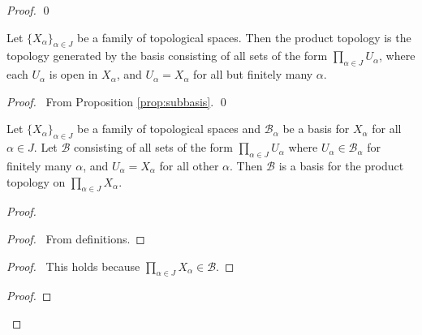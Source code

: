 \begin{proof}
  \pf
  \qed
\end{proof}

\begin{prop}
  Let $\{ X_\alpha \}_{\alpha \in J}$ be a family of topological spaces. Then the product topology is the topology generated by the basis consisting of all sets of the form $\prod_{\alpha \in J} U_\alpha$, where each $U_\alpha$ is open in $X_\alpha$, and $U_\alpha = X_\alpha$ for all but finitely many $\alpha$.
\end{prop}

\begin{proof}
  \pf\ From Proposition \ref{prop:subbasis}. \qed
\end{proof}

\begin{prop}
  \label{prop:product:basis}
  Let $\{ X_\alpha \}_{\alpha \in J}$ be a family of topological spaces and $\mathcal{B}_\alpha$ be a basis for $X_\alpha$ for all $\alpha \in J$. Let $\mathcal{B}$ consisting of all sets of the form $\prod_{\alpha \in J} U_\alpha$ where $U_\alpha \in \mathcal{B}_\alpha$ for finitely many $\alpha$, and
  $U_\alpha = X_\alpha$ for all other $\alpha$. Then $\mathcal{B}$ is a basis for the product topology on $\prod_{\alpha \in J} X_\alpha$.
\end{prop}

\begin{proof}
  \pf
  \begin{proof}
    \pf\ From definitions.
  \end{proof}
  \begin{proof}
    \pf\ This holds because $\prod_{\alpha \in J} X_\alpha \in \mathcal{B}$.
  \end{proof}
  \begin{proof}
  \end{proof}
\end{proof}

